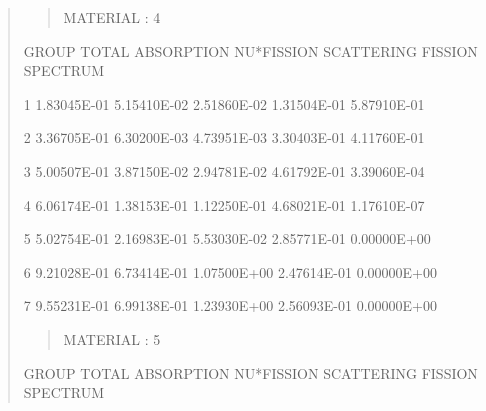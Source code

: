\documentclass[letterpaper,10pt,english]{sphinxmanual}
\begin{document}
\begin{quote}
\begin{quote}
MATERIAL :   4
\end{quote}

\begin{DUlineblock}{0em}
\item[] GROUP           TOTAL        ABSORPTION      NU*FISSION      SCATTERING      FISSION SPECTRUM       \textbar{}
\end{DUlineblock}

\begin{DUlineblock}{0em}
\item[] 1          1.83045E-01     5.15410E-02     2.51860E-02     1.31504E-01     5.87910E-01           \textbar{}
\item[] 2          3.36705E-01     6.30200E-03     4.73951E-03     3.30403E-01     4.11760E-01           \textbar{}
\item[] 3          5.00507E-01     3.87150E-02     2.94781E-02     4.61792E-01     3.39060E-04           \textbar{}
\item[] 4          6.06174E-01     1.38153E-01     1.12250E-01     4.68021E-01     1.17610E-07           \textbar{}
\item[] 5          5.02754E-01     2.16983E-01     5.53030E-02     2.85771E-01     0.00000E+00           \textbar{}
\item[] 6          9.21028E-01     6.73414E-01     1.07500E+00     2.47614E-01     0.00000E+00           \textbar{}
\item[] 7          9.55231E-01     6.99138E-01     1.23930E+00     2.56093E-01     0.00000E+00           \textbar{}
\end{DUlineblock}
\begin{quote}

MATERIAL :   5
\end{quote}

\begin{DUlineblock}{0em}
\item[] GROUP           TOTAL        ABSORPTION      NU*FISSION      SCATTERING      FISSION SPECTRUM       \textbar{}
\end{DUlineblock}


\end{quote}
\end{document}
